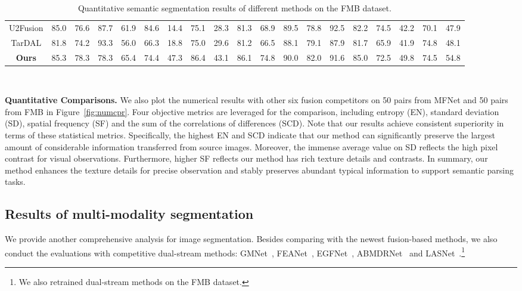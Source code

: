 \documentclass[10pt,twocolumn,letterpaper]{article}
\begin{document}
\begin{table*}[thb]
{\begin{tabular}{|c|cc|cc|cc|cc|cc|cc|cc|cc|cc|}
			\cellcolor{gray!15}U2Fusion   & 85.0 &	 76.6&  87.7&  61.9& \cellcolor{red!15}84.6 & 14.4 &  75.1&  28.3 & 81.3&  68.9 &\cellcolor{blue!15}89.5& 78.8&\cellcolor{red!15}92.5 &82.2 &  \cellcolor{blue!15}74.5 & 42.2&  70.1 & 47.9\\ 
			
			\cellcolor{gray!15}TarDAL & 81.8  & 74.2 & \cellcolor{red!15}93.3 & 56.0 &  66.3 & 18.8 &  75.0 &\cellcolor{blue!15}29.6&  81.2 & 66.5	&  88.1 & 79.1 &87.9 &81.7 &  65.9 & 41.9  & \cellcolor{red!15}74.8 & 48.1 \\
			
			\cellcolor{yellow!15}\textbf{Ours}   & 85.3  & \cellcolor{blue!15}78.3 &  78.3 & \cellcolor{blue!15}65.4 & \cellcolor{blue!15}74.4 & 	\cellcolor{red!15}47.3 &  \cellcolor{red!15}86.4 & 	\cellcolor{red!15}43.1 & \cellcolor{red!15}86.1 &  \cellcolor{red!15}74.8& \cellcolor{red!15}90.0 & \cellcolor{red!15}82.0 &\cellcolor{blue!15}91.6 &85.0&  72.5 & \cellcolor{red!15}49.8  &  \cellcolor{blue!15}74.5 & 	\cellcolor{red!15}54.8 \\\hline
\end{tabular} }
	\caption{ Quantitative semantic segmentation results of different methods on the {FMB} dataset.}~\label{tab:data_set_results_seg}
\end{table*}



\noindent\textbf{Quantitative Comparisons.} We also plot the numerical results with other six fusion competitors on 50 pairs from MFNet and 50 pairs from FMB in Figure~\ref{fig:numcpr}. Four objective metrics are leveraged for the comparison, including entropy (EN)\cite{Roberts2008Assessment}, standard
deviation (SD)\cite{aslantas2015new}, spatial frequency (SF)\cite{Cui2015Detail} and the sum of the correlations of differences (SCD)\cite{zheng2023deep}. Note that our results achieve consistent superiority in terms of these statistical metrics. Specifically, the highest EN and SCD indicate that our method can significantly preserve the largest amount of considerable information transferred from source images. Moreover, the immense average value on SD reflects the high pixel contrast for
visual observations.  Furthermore, higher SF reflects our method has rich texture details and contrasts. 
In summary, our method enhances the texture details for precise observation and stably preserves abundant typical information to support semantic parsing tasks.



\subsection{Results of multi-modality segmentation}
We provide another comprehensive analysis for image segmentation. 
Besides comparing with the newest fusion-based methods, we also conduct the  evaluations with competitive dual-stream methods: GMNet~\cite{zhou2021gmnet}, FEANet~\cite{deng2021feanet}, EGFNet~\cite{zhou2021edge}, ABMDRNet~\cite{abmdrnet} and LASNet~\cite{li2022rgb}.\footnote{We also retrained dual-stream methods on the FMB dataset.}
\end{document}
